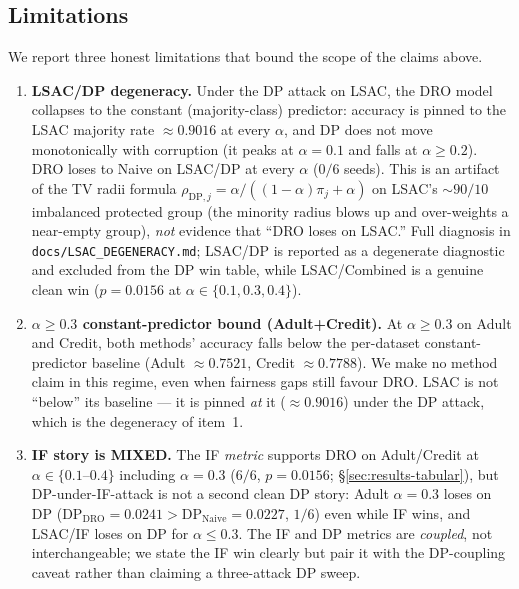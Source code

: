 \subsection{Limitations}
\label{sec:limitations}
We report three honest limitations that bound the scope of the claims
above.
\begin{enumerate}
\item \textbf{LSAC/DP degeneracy.}  Under the DP attack on LSAC, the
DRO model collapses to the constant (majority-class) predictor:
accuracy is pinned to the LSAC majority rate $\approx0.9016$ at every
$\alpha$, and DP does not move monotonically with corruption (it peaks
at $\alpha{=}0.1$ and falls at $\alpha\ge0.2$).  DRO loses to Naive on
LSAC/DP at every $\alpha$ ($0/6$ seeds).  This is an artifact of the TV
radii formula $\rho_{\mathrm{DP},j}=\alpha/((1-\alpha)\pi_j+\alpha)$ on
LSAC's $\sim90/10$ imbalanced protected group (the minority radius
blows up and over-weights a near-empty group), \emph{not} evidence that
``DRO loses on LSAC.''  Full diagnosis in
\texttt{docs/LSAC\_DEGENERACY.md}; LSAC/DP is reported as a degenerate
diagnostic and excluded from the DP win table, while LSAC/Combined is a
genuine clean win ($p{=}0.0156$ at $\alpha\in\{0.1,0.3,0.4\}$).

\item \textbf{$\alpha\ge0.3$ constant-predictor bound (Adult+Credit).}
At $\alpha\ge0.3$ on Adult and Credit, both methods' accuracy falls
below the per-dataset constant-predictor baseline (Adult
$\approx0.7521$, Credit $\approx0.7788$).  We make no method claim in
this regime, even when fairness gaps still favour DRO.  LSAC is not
``below'' its baseline --- it is pinned \emph{at} it ($\approx0.9016$)
under the DP attack, which is the degeneracy of item~1.

\item \textbf{IF story is MIXED.}  The IF \emph{metric} supports DRO on
Adult/Credit at $\alpha\in\{0.1$--$0.4\}$ including $\alpha{=}0.3$
($6/6$, $p{=}0.0156$; \S\ref{sec:results-tabular}), but
DP-under-IF-attack is not a second clean DP story: Adult $\alpha{=}0.3$
loses on DP ($\mathrm{DP}_{\mathrm{DRO}}{=}0.0241 >
\mathrm{DP}_{\mathrm{Naive}}{=}0.0227$, $1/6$) even while IF wins, and
LSAC/IF loses on DP for $\alpha\le0.3$.  The IF and DP metrics are
\emph{coupled}, not interchangeable; we state the IF win clearly but
pair it with the DP-coupling caveat rather than claiming a three-attack
DP sweep.


\end{enumerate}
